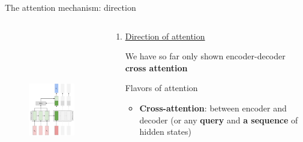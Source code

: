 \documentclass[12pt,aspectratio=169,handout]{beamer}
\newcounter{saveenumi}
\newcommand{\conti}{\setcounter{enumi}{\value{saveenumi}}}
\begin{document}
\begin{frame}{The attention mechanism: direction}

	\begin{columns}[T] %
		\begin{column}{.48\textwidth}
			\begin{figure}[h]
				\includegraphics[height=7cm]{seq2seq_attn_encdec.pdf}
			\end{figure}
		\end{column}
		\begin{column}{.48\textwidth}
			\begin{enumerate}
				\conti
				\item \underline{Direction of attention}
		
				We have so far only shown encoder-decoder \textbf{cross attention}
				\pause
				\hspace{1em}
				
				Flavors of attention
				\begin{itemize}
					\item \textbf{Cross-attention}:
					between encoder and decoder (or any \textbf{query} and \textbf{a sequence} of hidden states)
				\end{itemize}
			\end{enumerate}
		\end{column}
	\end{columns}

\end{frame}
\end{document}
